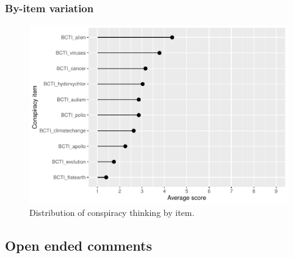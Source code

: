 \documentclass[
  doc,floatsintext]{apa6}
\begin{document}
\subsubsection{By-item variation}\label{by-item-variation}



\begin{figure}
\centering
\includegraphics{output/figures/exp1-conspiracy-items.pdf}
\caption{\label{fig:exp1-conspiracy-items}Distribution of conspiracy thinking by item.}
\end{figure}

\subsection{Open ended comments}\label{open-ended-comments}
\end{document}
